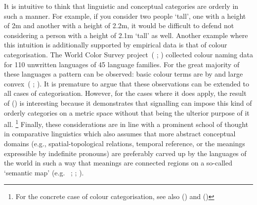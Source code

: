 \documentclass[11pt,english]{article}
\numberwithin{equation}{section}
\newcommand{\citetbjps}[1]{\citeauthor{#1} (\citeyear{#1})}
\newcommand{\citealtbjps}[1]{\citeauthor{#1} \citeyear{#1}}
\begin{document}
It is intuitive to think that linguistic and conceptual categories are orderly in such a
manner.  For example, if you consider two people `tall', one with a height of 2m and another with a
height of 2.2m, it would be difficult to defend not considering a person with a height
of 2.1m `tall' as well. Another example where this intuition is additionally supported by empirical data is that of colour categorisation. The World Color Survey
project~(\citealtbjps{CookKay2005:The-World-Color}; \citealtbjps{WCS}) collected colour naming data for 110 unwritten
languages of 45 language families.  For the great majority of these languages a pattern can be
observed: basic colour terms are by and large convex~(\citealtbjps{Regier07}; \citealtbjps{Jager2010}). It
is premature to argue that these observations can be extended to all cases of
categorisation. However, for the cases where it does apply, the result of
\citetbjps{JagerMetzger2011:Voronoi-Languag} is interesting because it demonstrates that signalling
can impose this kind of orderly categories on a metric space without that being the ulterior
purpose of it all.%
\footnote{For the concrete case of colour categorisation, see also
  \citetbjps{JagerRooijvan-Rooij2007:Language-Struct} and \citetbjps{Correia2015}}
Finally, these considerations are in line with a prominent
school of thought in comparative linguistics which also assumes that more abstract conceptual domains
(e.g., spatial-topological relations, temporal reference, or the meanings expressible by
indefinite pronouns) are preferably carved up by the languages of the world in such a way
that meanings are connected regions on a so-called `semantic map'
(e.g.~\citealtbjps{Croft2003:Typology-and-Un}; \citealtbjps{Haspelmath2003:The-geometry-of}; \citealtbjps{LevinsonMeira2003:Natural-concept}).
\end{document}
